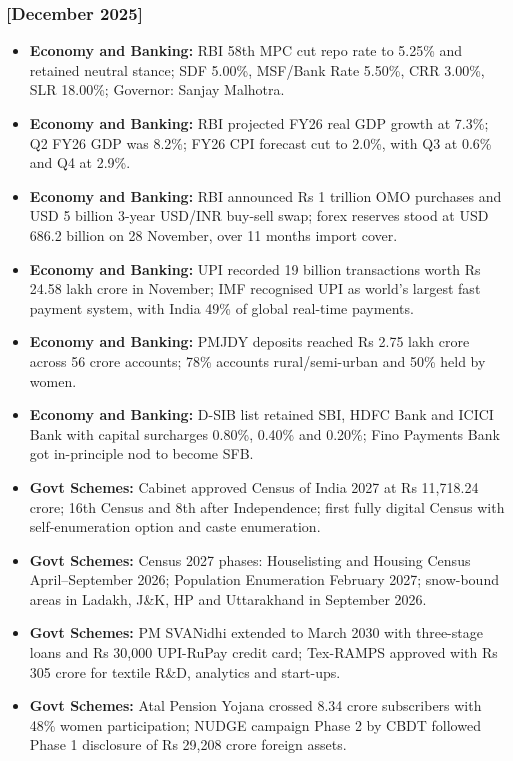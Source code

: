 \documentclass[10pt,a4paper]{article}
\newcommand{\monthtag}[1]{\textbf{[#1]}}
\begin{document}
\subsubsection{\monthtag{December 2025}}
\begin{itemize}
    \item \textbf{Economy and Banking:} RBI 58th MPC cut repo rate to 5.25\% and retained neutral stance; SDF 5.00\%, MSF/Bank Rate 5.50\%, CRR 3.00\%, SLR 18.00\%; Governor: Sanjay Malhotra.
    \item \textbf{Economy and Banking:} RBI projected FY26 real GDP growth at 7.3\%; Q2 FY26 GDP was 8.2\%; FY26 CPI forecast cut to 2.0\%, with Q3 at 0.6\% and Q4 at 2.9\%.
    \item \textbf{Economy and Banking:} RBI announced Rs 1 trillion OMO purchases and USD 5 billion 3-year USD/INR buy-sell swap; forex reserves stood at USD 686.2 billion on 28 November, over 11 months import cover.
    \item \textbf{Economy and Banking:} UPI recorded 19 billion transactions worth Rs 24.58 lakh crore in November; IMF recognised UPI as world's largest fast payment system, with India 49\% of global real-time payments.
    \item \textbf{Economy and Banking:} PMJDY deposits reached Rs 2.75 lakh crore across 56 crore accounts; 78\% accounts rural/semi-urban and 50\% held by women.
    \item \textbf{Economy and Banking:} D-SIB list retained SBI, HDFC Bank and ICICI Bank with capital surcharges 0.80\%, 0.40\% and 0.20\%; Fino Payments Bank got in-principle nod to become SFB.
    \item \textbf{Govt Schemes:} Cabinet approved Census of India 2027 at Rs 11,718.24 crore; 16th Census and 8th after Independence; first fully digital Census with self-enumeration option and caste enumeration.
    \item \textbf{Govt Schemes:} Census 2027 phases: Houselisting and Housing Census April--September 2026; Population Enumeration February 2027; snow-bound areas in Ladakh, J\&K, HP and Uttarakhand in September 2026.
    \item \textbf{Govt Schemes:} PM SVANidhi extended to March 2030 with three-stage loans and Rs 30,000 UPI-RuPay credit card; Tex-RAMPS approved with Rs 305 crore for textile R\&D, analytics and start-ups.
    \item \textbf{Govt Schemes:} Atal Pension Yojana crossed 8.34 crore subscribers with 48\% women participation; NUDGE campaign Phase 2 by CBDT followed Phase 1 disclosure of Rs 29,208 crore foreign assets.

\end{itemize}
\end{document}
